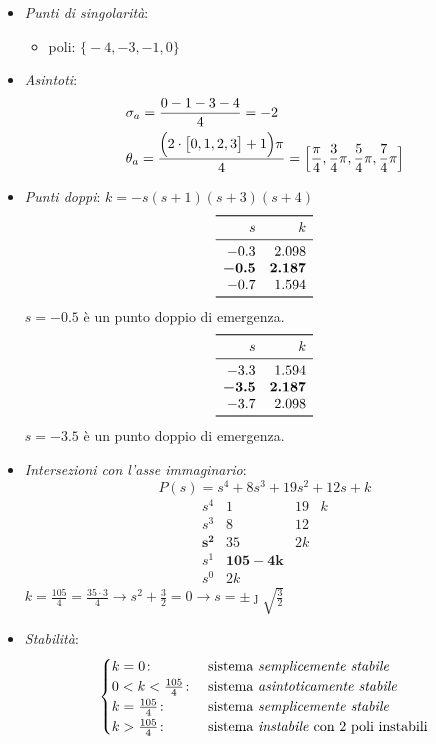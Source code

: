 \begin{itemize}
	\item \emph{Punti di singolarità}:
		\begin{itemize}
			\item poli: \(\bigl\{ -4,-3,-1,0 \bigr\}\)
		\end{itemize}
	\item \emph{Asintoti}:
		\begin{align*}
			& \sigma_a = \frac{0-1-3-4}{4} = -2 \\
			& \theta_a = \frac{\Bigl(2\cdot\bigl[0,1,2,3\bigr]+1\Bigr)\pi}{4} = \Bigl[ \frac{\pi}{4},\frac{3}{4}\pi,\frac{5}{4}\pi,\frac{7}{4}\pi \Bigr]
		\end{align*}
	\item \emph{Punti doppi}: \(k = -s(s+1)(s+3)(s+4)\)
		\[\begin{array}{rr}
			\toprule
			s 	  & k 		\\
			\midrule
			-0.3 	  & 2.098 	\\
			\bm{-0.5} & \bm{2.187}	\\
			-0.7 	  & 1.594	\\
			\bottomrule
		\end{array}\]
		\(s=-0.5\) è un punto doppio di emergenza.
		\[\begin{array}{rr}
			\toprule
			s 	  & k 		\\
			\midrule
			-3.3 	  & 1.594 	\\
			\bm{-3.5} & \bm{2.187} 	\\
			-3.7 	  & 2.098 	\\
			\bottomrule
		\end{array}\]
		\(s=-3.5\) è un punto doppio di emergenza.
	\item \emph{Intersezioni con l'asse immaginario}:
		\[
			P(s) = s^4 +8s^3 +19s^2 +12s +k
		\]
		\[\begin{array}{r|rrr}
			s^4 	 &  1 & 19 & k  \\
			s^3 	 &  8 & 12 	\\
			\bm{s^2} & 35 & 2k 	\\
			s^1 	 & \bm{105-4k} 	\\
			s^0 	 & 2k
		\end{array}\]
		\(k = \frac{105}{4} = \frac{35\cdot3}{4} \rightarrow s^2+\frac{3}{2} = 0 \rightarrow s = \pm\jmath\sqrt{\frac{3}{2}}\)
	\item \emph{Stabilità}:
		\[\begin{cases}
			k = 0\colon & \text{sistema \emph{semplicemente stabile}} \\
			0<k<\frac{105}{4}\colon & \text{sistema \emph{asintoticamente stabile}} \\
			k = \frac{105}{4}\colon & \text{sistema \emph{semplicemente stabile}} \\
			k > \frac{105}{4}\colon & \text{sistema \emph{instabile} con 2 poli instabili}
		\end{cases}\]
\end{itemize}

